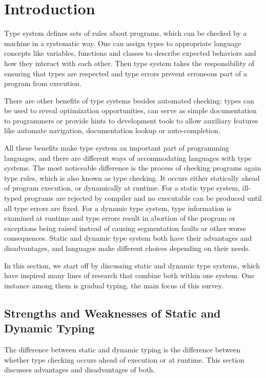 
\section{Introduction}


Type system defines sets of rules about programs, which can be checked by a machine
in a systematic way.
One can assign types to appropriate language concepts like
variables, functions and classes to describe expected behaviors
and how they interact with each other.
Then type system takes the responsibility of ensuring that types are respected and
type errors prevent erroneous part of a program from execution.

There are other benefits of type systems besides automated checking:
types can be used to reveal optimization opportunities,
can serve as simple documentation to programmers or
provide hints to development tools to allow auxiliary features like
automate navigation, documentation lookup
or auto-completion.

All these benefits make type system an important part of programming languages,
and there are different ways of accommodating languages with type systems.
The most noticeable difference is the process of checking programs again type rules,
which is also known as type checking.
It occurs either statically ahead of program execution, or dynamically at runtime.
For a static type system, ill-typed programs are rejected by compiler and
no executable can be produced until all type errors are fixed.
For a dynamic type system,
type information is examined at runtime and type errors result
in abortion of the program or exceptions being raised
instead of causing segmentation faults or other worse consequences.
Static and dynamic type system both have their advantages and disadvantages,
and languages make different choices depending on their needs.

In this section, we start off by discussing static and dynamic type systems,
which have inspired many lines of research that combine both within one system.
One instance among them is gradual typing, the main focus of this survey.

\subsection{Strengths and Weaknesses of Static and Dynamic Typing}

The difference between static and dynamic typing is the difference
between whether type checking occurs ahead of execution or at runtime.
This section discusses advantages and disadvantages of both.

